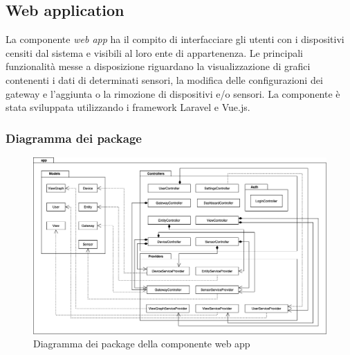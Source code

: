 \subsection{Web application}
	La componente \textit{web app} ha il compito di interfacciare gli utenti con i dispositivi censiti dal sistema e visibili al loro ente di appartenenza.
	\newline
	Le principali funzionalità messe a disposizione riguardano la visualizzazione di grafici contenenti i dati di determinati sensori, la modifica delle configurazioni dei gateway e l'aggiunta o la rimozione di dispositivi e/o sensori.
	\newline 
	La componente è stata sviluppata utilizzando i framework Laravel e Vue.js.
	
	\subsubsection{Diagramma dei package}%
		\begin{figure}[H]
			\centering
			\includegraphics[scale=0.450]{res/images/WEBAPP/WebAppPackage.png}
			\caption{Diagramma dei package della componente web app}
			\label{Diagramma 21}
		\end{figure}
	
